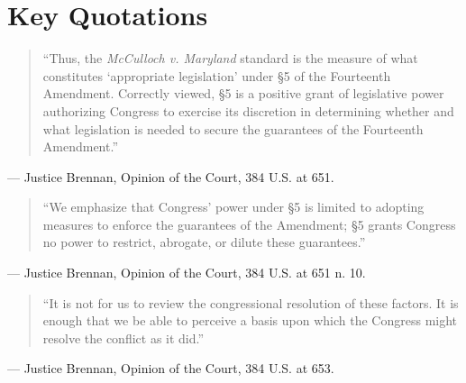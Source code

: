 \documentclass[12pt]{article}
\begin{document}
\section{Key Quotations}

\begin{quote}
``Thus, the \textit{McCulloch v. Maryland} standard is the measure of what constitutes `appropriate legislation' under \S 5 of the Fourteenth Amendment. Correctly viewed, \S 5 is a positive grant of legislative power authorizing Congress to exercise its discretion in determining whether and what legislation is needed to secure the guarantees of the Fourteenth Amendment.''
\end{quote}
\noindent --- Justice Brennan, Opinion of the Court, 384 U.S. at 651.

\begin{quote}
``We emphasize that Congress' power under \S 5 is limited to adopting measures to enforce the guarantees of the Amendment; \S 5 grants Congress no power to restrict, abrogate, or dilute these guarantees.''
\end{quote}
\noindent --- Justice Brennan, Opinion of the Court, 384 U.S. at 651 n. 10.

\begin{quote}
``It is not for us to review the congressional resolution of these factors. It is enough that we be able to perceive a basis upon which the Congress might resolve the conflict as it did.''
\end{quote}
\noindent --- Justice Brennan, Opinion of the Court, 384 U.S. at 653.
\end{document}
